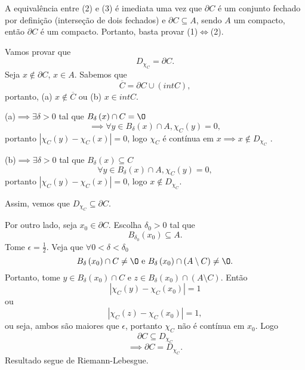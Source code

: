 \begin{demo}
    A equivalência entre (2) e (3) é imediata uma vez que $\partial C$ é um conjunto fechado por definição (interseção de dois fechados) e $\partial C \subseteq A$, sendo $A$ um compacto, então $\partial C$ é um compacto. Portanto, basta provar (1)$\iff$(2).

    Vamos provar que \[
    D_{\chi_C} = \partial C
    .\] Seja $x\not\in \partial C$, $x\in A$. Sabemos que \[
    \overline{C} = \partial C \cup \left( int C \right) 
,\] portanto, (a) $x\not\in \overline{C}$ ou (b) $x\in int C$.

(a)$\implies \exists \delta>0$ tal que $B_{\delta}\left( x \right) \cap C = \O$ \[
\implies \forall y\in B_{\delta}\left( x \right) \cap A, \chi_C\left( y \right) = 0
,\] portanto $\left| \chi_C\left( y \right) - \chi_C\left( x \right)  \right| =0$, logo $\chi_C$ é contínua em $x \implies x\not\in D_{\chi_C}$ .

(b)$\implies \exists \delta>0$ tal que $B_\delta\left( x \right) \subseteq C$ \[
\forall y\in B_\delta\left( x \right) \cap A, \chi_C\left( y \right) = 0
,\] portanto $\left| \chi_C\left( y \right) -\chi_C\left( x \right)  \right| =0$, logo $x\not\in D_{\chi_C}$.

Assim, vemos que $D_{\chi_C}\subseteq\partial C$.

Por outro lado, seja $x_0\in \partial C$. Escolha $\delta_0>0$ tal que \[
B_{\delta_0}\left( x_0 \right) \subseteq A
.\] Tome $\epsilon = \frac{1}{2}$. Veja que $\forall 0<\delta < \delta_0$\[
B_{\delta}\left( x_0 \right) \cap C \neq  \O \text{ e }B_{\delta}\left( x_0 \right) \cap \left( A\setminus C \right) \neq \O
.\] Portanto, tome $y\in B_{\delta}\left( x_0 \right) \cap C$ e $z\in B_{\delta}\left( x_0 \right) \cap \left( A\setminus C \right)$. Então \[
\left| \chi_C\left( y \right) -\chi_C\left( x_0 \right)  \right| = 1
\] ou \[
\left| \chi_C\left( z \right) -\chi_C\left( x_0 \right)  \right| = 1
,\] ou seja, ambos são maiores que $\epsilon$, portanto $\chi_C$ não é contínua em $x_0$. Logo \[
\partial C \subseteq D_{\chi_C}
\] \[
\implies \partial C = D_{\chi_C}
.\] Resultado segue de Riemann-Lebesgue.
\end{demo}

